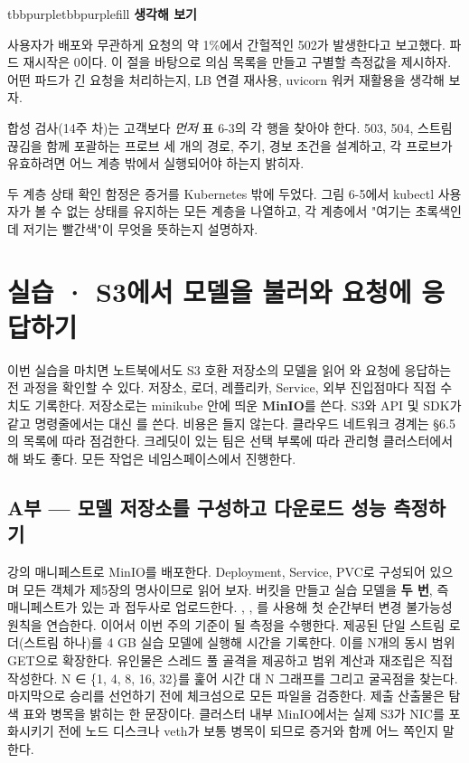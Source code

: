 \begin{calloutbox}{tbbpurple}{tbbpurplefill}
{\normalsize\bfseries\color{tbbpurple}생각해 보기}\par\vspace{3pt}
\begin{tbbitemize}
  \item 사용자가 배포와 무관하게 요청의 약 1\%에서 간헐적인 502가 발생한다고 보고했다. 파드 재시작은 0이다. 이 절을 바탕으로 의심 목록을 만들고 구별할 측정값을 제시하자. 어떤 파드가 긴 요청을 처리하는지, LB 연결 재사용, uvicorn 워커 재활용을 생각해 보자.
  \item 합성 검사(14주 차)는 고객보다 \textit{먼저} 표 6-3의 각 행을 찾아야 한다. 503, 504, 스트림 끊김을 함께 포괄하는 프로브 세 개의 경로, 주기, 경보 조건을 설계하고, 각 프로브가 유효하려면 어느 계층 밖에서 실행되어야 하는지 밝히자.
  \item 두 계층 상태 확인 함정은 증거를 Kubernetes 밖에 두었다. 그림 6-5에서 kubectl 사용자가 볼 수 없는 상태를 유지하는 모든 계층을 나열하고, 각 계층에서 "여기는 초록색인데 저기는 빨간색"이 무엇을 뜻하는지 설명하자.
\end{tbbitemize}
\end{calloutbox}

\section{실습 · S3에서 모델을 불러와 요청에 응답하기}

이번 실습을 마치면 노트북에서도 S3 호환 저장소의 모델을 읽어 와 요청에 응답하는 전 과정을 확인할 수 있다. 저장소, 로더, 레플리카, Service, 외부 진입점마다 직접 수치도 기록한다. 저장소로는 minikube 안에 띄운 \textbf{MinIO}를 쓴다. S3와 API 및 SDK가 같고 명령줄에서는  대신 를 쓴다. 비용은 들지 않는다. 클라우드 네트워크 경계는 §6.5의 목록에 따라 점검한다. 크레딧이 있는 팀은 선택 부록에 따라 관리형 클러스터에서 해 봐도 좋다. 모든 작업은  네임스페이스에서 진행한다.

\subsection*{A부 — 모델 저장소를 구성하고 다운로드 성능 측정하기}

강의 매니페스트로 MinIO를 배포한다. Deployment, Service, PVC로 구성되어 있으며 모든 객체가 제5장의 명사이므로 읽어 보자. 버킷을 만들고 실습 모델을 \textbf{두 번}, 즉 매니페스트가 있는 과  접두사로 업로드한다. , , 를 사용해 첫 순간부터 변경 불가능성 원칙을 연습한다. 이어서 이번 주의 기준이 될 측정을 수행한다. 제공된 단일 스트림 로더(스트림 하나)를 4 GB 실습 모델에 실행해 시간을 기록한다. 이를 N개의 동시 범위 GET으로 확장한다. 유인물은 스레드 풀 골격을 제공하고 범위 계산과 재조립은 직접 작성한다. N ∈ \{1, 4, 8, 16, 32\}를 훑어 시간 대 N 그래프를 그리고 굴곡점을 찾는다. 마지막으로 승리를 선언하기 전에  체크섬으로 모든 파일을 검증한다. 제출 산출물은 탐색 표와 병목을 밝히는 한 문장이다. 클러스터 내부 MinIO에서는 실제 S3가 NIC를 포화시키기 전에 노드 디스크나 veth가 보통 병목이 되므로  증거와 함께 어느 쪽인지 말한다.

